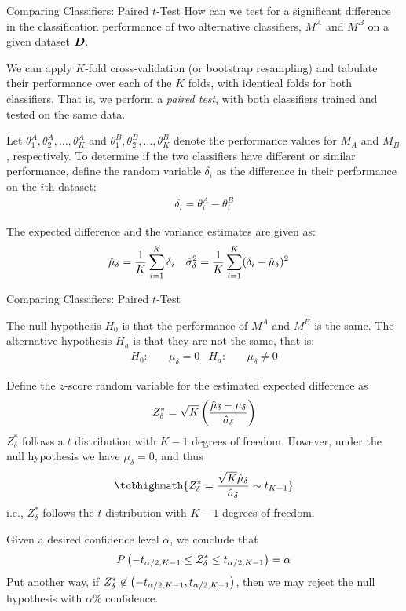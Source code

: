 \begin{frame}{Comparing Classif\/{i}ers: Paired $t$-Test}
How can we test for a signif\/{i}cant
difference in the classif\/{i}cation performance of two alternative
classif\/{i}ers, $M^A$ and $M^B$ on a given dataset ${\boldsymbol D}$.

\medskip
We can apply $K$-fold
cross-validation (or bootstrap resampling) and tabulate their
performance over each of the $K$ folds, with identical folds for
both classif\/{i}ers. 
That is, we perform a {\em paired test}, with
both classif\/{i}ers trained and tested on the same data. 

\medskip
Let
$\theta_1^A, \theta_2^A, \ldots, \theta_K^A$ and $\theta_1^B,
\theta_2^B, \ldots, \theta_K^B$ denote the performance values for
$M_A$ and $M_B$, respectively. To determine if the two classif\/{i}ers
have different or similar performance, def\/{i}ne the random variable $\delta_i$ as the difference in their performance on the $i$th
dataset:
\begin{align*}
  \delta_i = \theta_i^A - \theta_i^B
\end{align*}

\medskip
The expected difference and the
variance estimates are given as:
\begin{align*}
  \hat{\mu}_{\delta} &= {1\over K} \sum_{i=1}^K \delta_i &
  \hat{\sigma}^2_{\delta} &= {1\over K} \sum_{i=1}^K (\delta_i -
  \hat{\mu}_{\delta})^2
\end{align*}
\end{frame}


\begin{frame}{Comparing Classif\/{i}ers: Paired $t$-Test}
\small
  
The null hypothesis $H_0$ is that the
performance of $M^A$ and $M^B$ is the same.
The alternative hypothesis $H_a$ is that they are
not the same, that is:
\begin{align*}
  H_0\!: & \quad \mu_\delta = 0 & H_a\!: & \quad\mu_\delta \ne 0
\end{align*}

\medskip
Def\/{i}ne the $z$-score random variable for the estimated
expected difference as
\begin{align*}
  Z^*_\delta = \sqrt{K} \left( {\hat{\mu}_\delta  - \mu_\delta \over \hat{\sigma}_\delta} \right)
\end{align*}
$Z^*_\delta$ follows a $t$
distribution with $K-1$ degrees of freedom. However, under the
null hypothesis we have $\mu_\delta = 0$, and thus
\begin{align*}
\tcbhighmath{
  Z^*_\delta = {\sqrt{K} \hmu_\delta \over \hsigma_\delta} \sim t_{K-1}
}
\end{align*}
i.e., $Z^*_\delta$
follows the $t$ distribution with $K-1$ degrees of freedom.

\medskip
Given a desired conf\/{i}dence level $\alpha$, we conclude that
\begin{align*}
  P\left(-t_{\alpha/2,K-1} \le Z^*_\delta \le t_{\alpha/2,K-1}\right) =
  \alpha
\end{align*}
Put another way, if $Z^*_\delta \not\in \left(-t_{\alpha/2,K-1},
t_{\alpha/2,K-1} \right)$, then we may reject the null hypothesis
with $\alpha\%$ conf\/{i}dence. 
\end{frame}



